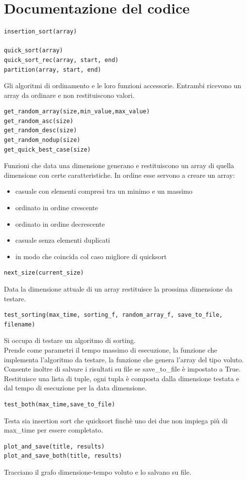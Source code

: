 \documentclass[]{article}
\begin{document}
\section{Documentazione del codice}
\begin{verbatim}
insertion_sort(array)

quick_sort(array)
quick_sort_rec(array, start, end)
partition(array, start, end)
\end{verbatim}
Gli algoritmi di ordinamento e le loro funzioni accessorie. Entrambi ricevono un array da ordinare e non restituiscono valori.
\begin{verbatim}
get_random_array(size,min_value,max_value)
get_random_asc(size)
get_random_desc(size)
get_random_nodup(size)
get_quick_best_case(size)
\end{verbatim}
Funzioni che data una dimensione generano e restituiscono un array di quella dimensione con certe caratteristiche. In ordine esse servono a creare un array:
\begin{itemize}
\item casuale con elementi compresi tra un minimo e un massimo
\item ordinato in ordine crescente
\item ordinato in ordine decrescente
\item casuale senza elementi duplicati
\item in modo che coincida col caso migliore di quicksort
\end{itemize}
\begin{verbatim}
next_size(current_size)
\end{verbatim}
Data la dimensione attuale di un array restituisce la prossima dimensione da testare.
\begin{verbatim}
test_sorting(max_time, sorting_f, random_array_f, save_to_file, filename)
\end{verbatim}
Si occupa di testare un algoritmo di sorting.\\
Prende come parametri il tempo massimo di esecuzione, la funzione che implementa l'algoritmo da testare, la funzione che genera l'array del tipo voluto. Consente inoltre di salvare i risultati su file se save\_to\_file è impostato a True.\\
Restituisce una lista di tuple, ogni tupla è composta dalla dimensione testata e dal tempo di esecuzione per la data dimensione.
\begin{verbatim}
test_both(max_time,save_to_file)
\end{verbatim}
Testa sia insertion sort che quicksort finchè uno dei due non impiega più di max\_time per essere completato.
\begin{verbatim}
plot_and_save(title, results)
plot_and_save_both(title, results)
\end{verbatim}
Tracciano il grafo dimensione-tempo voluto e lo salvano su file.
\end{document}
